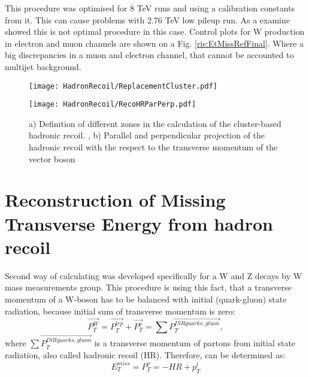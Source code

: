 This procedure was optimised for 8 TeV runs  and using a calibration constants from it. This can cause problems with 2.76 TeV low pileup run. As a examine showed this is not optimal procedure in this case. Control plots for W production in electron and muon channels are shown on a  Fig. \ref{ris:EtMissRefFinal}. Where a big discrepancies in a muon and electron channel, that cannot be accounted to multijet background. 

\begin{figure}[!tbp]
\begin{center}
\begin{minipage}[h]{0.49\linewidth}
\texttt{[image: HadronRecoil/ReplacementCluster.pdf]}
\end{minipage}
\hfill
\begin{minipage}[h]{0.49\linewidth}
\texttt{[image: HadronRecoil/RecoHRParPerp.pdf]}
\end{minipage}
\caption{a) Definition of different zones in the calculation of the cluster-based hadronic recoil. \label{ris:subsCone}, b) Parallel and perpendicular projection of the hadronic recoil with the respect to the transverse momentum of the vector boson \label{ris:HadrRecoilTruthPt}}
\end{center}
\end{figure}


\section{Reconstruction of Missing Transverse Energy from hadron recoil}
Second way of calculating \etmiss was developed specifically for a W and Z decays by W mass measurements group. This procedure is using this fact, that a transverse momentum of a W-boson has to be balanced with initial (quark-gluon) state radiation, because initial sum of transverse momentum is zero:
\begin{equation}
\vec{P_{T}^{W}} = \vec{P_T^{lep}}+\vec{P_T^{\nu}}= \sum{\vec{P_{T}^{ISRquarks,gluon}}}, 
\end{equation}
where $\sum{\vec{P_{T}^{ISRquarks,gluon}}}$ is a transverse momentum of partons from initial state radiation, also called hadronic recoil (HR). Therefore, \etmiss can be determined as:
\begin{equation}
E_{T}^{miss} = P_T^{\nu} =  - HR + p_T^{l}
\end{equation} 

